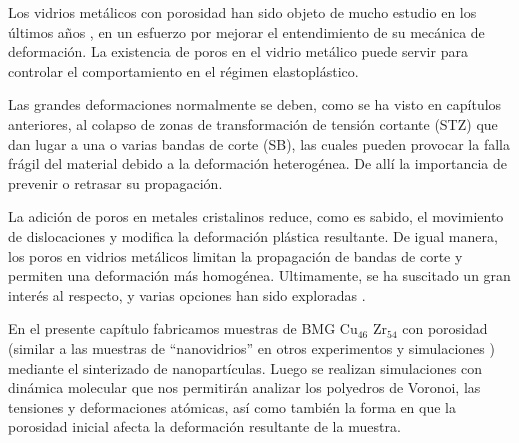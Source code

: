 Los vidrios metálicos con porosidad han sido objeto de mucho estudio en los últimos años \citep{guan13,wang10}, en un esfuerzo
por mejorar el entendimiento de su mecánica de deformación. La existencia de poros en el vidrio metálico puede servir para 
controlar el comportamiento en el régimen elastoplástico.

Las grandes deformaciones normalmente se deben, como se ha visto en capítulos anteriores, al colapso de zonas de transformación de
tensión cortante (STZ) que dan lugar a una o varias bandas de corte (SB), las cuales pueden provocar la falla frágil del material debido a la
deformación heterogénea. De allí la importancia de prevenir o retrasar su propagación.

La adición de poros en metales cristalinos reduce, como es sabido, el movimiento de dislocaciones y modifica la
deformación plástica resultante. De igual manera, los poros en vidrios metálicos limitan la propagación de bandas de corte y permiten
una deformación más homogénea. Ultimamente, se ha suscitado un gran interés al respecto, y varias opciones han sido exploradas
\citep{guan13,wang10,schuh07,liontas14}.

En el presente capítulo fabricamos muestras de BMG Cu$_{46}$ Zr$_{54}$ con porosidad
(similar a las muestras de ``nanovidrios'' en otros experimentos y simulaciones \citep{adibi13,albe13}) mediante el sinterizado de nanopartículas.
Luego se realizan simulaciones con dinámica molecular que nos permitirán analizar los polyedros de Voronoi, las tensiones y deformaciones atómicas,
así como también la forma en que la porosidad inicial afecta la deformación resultante de la muestra.




